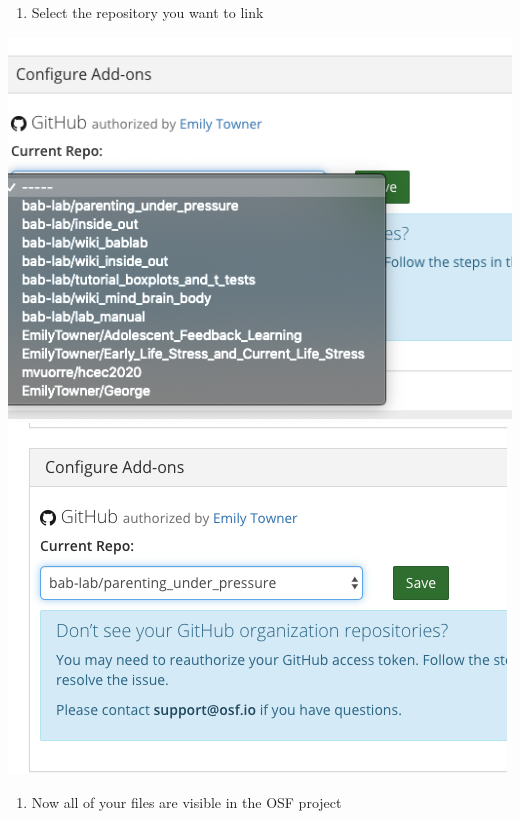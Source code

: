 \documentclass[]{book}
\providecommand{\tightlist}{%
  \setlength{\itemsep}{0pt}\setlength{\parskip}{0pt}}
\begin{document}
\begin{enumerate}
\def\labelenumi{\arabic{enumi}.}
\setcounter{enumi}{5}
\tightlist
\item
  Select the repository you want to link
\end{enumerate}

\includegraphics{images/research_protocols/osf/7.png}
\includegraphics{images/research_protocols/osf/8.png}

\begin{enumerate}
\def\labelenumi{\arabic{enumi}.}
\setcounter{enumi}{6}
\tightlist
\item
  Now all of your files are visible in the OSF project
\end{enumerate}
\end{document}
